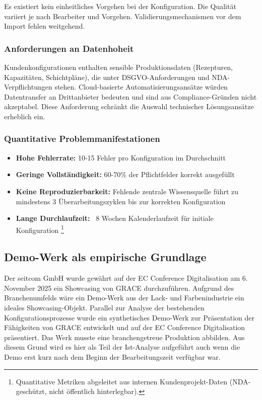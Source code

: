 Es existiert kein einheitliches Vorgehen bei der Konfiguration. Die Qualität variiert je nach Bearbeiter und Vorgehen. Validierungsmechanismen vor dem Import fehlen weitgehend.

\subsubsection{Anforderungen an Datenhoheit}
\label{subsubsec:Datenhoheit}

Kundenkonfigurationen enthalten sensible Produktionsdaten (Rezepturen, Kapazitäten, Schichtpläne), die unter DSGVO-Anforderungen und NDA-Verpflichtungen stehen. Cloud-basierte Automatisierungsansätze würden Datentransfer an Drittanbieter bedeuten und sind aus Compliance-Gründen nicht akzeptabel. Diese Anforderung schränkt die Auswahl technischer Lösungsansätze erheblich ein.

\subsubsection{Quantitative Problemmanifestationen}
\label{subsubsec:QuantitativeProbleme}

\begin{itemize}
    \item \textbf{Hohe Fehlerrate:} 10-15 Fehler pro Konfiguration im Durchschnitt
    \item \textbf{Geringe Vollständigkeit:} 60-70\% der Pflichtfelder korrekt ausgefüllt
    \item \textbf{Keine Reproduzierbarkeit:} Fehlende zentrale Wissensquelle führt zu mindestens 3 Überarbeitungszyklen bis zur korrekten Konfiguration
    \item \textbf{Lange Durchlaufzeit:} ~8 Wochen Kalenderlaufzeit für initiale Konfiguration \footnote{Quantitative Metriken abgeleitet aus internen Kundenprojekt-Daten (NDA-geschützt, nicht öffentlich hinterlegbar).}
\end{itemize}


\subsection{Demo-Werk als empirische Grundlage}
\label{subsec:DemoWerk}
Der seitcom GmbH wurde gewährt auf der EC Conference Digitalisation am 6. November 2025 ein Showcasing von GRACE durchzuführen. Aufgrund des Branchenumfelds wäre ein Demo-Werk aus der Lack- und Farbenindustrie ein ideales Showcasing-Objekt. Parallel zur Analyse der bestehenden Konfigurationsprozesse wurde ein synthetisches Demo-Werk zur Präsentation der Fähigkeiten von GRACE entwickelt und auf der EC Conference Digitalisation präsentiert. Das Werk musste eine branchengetreue Produktion abbilden. Aus diesem Grund wird es hier als Teil der Ist-Analyse aufgeführt auch wenn die Demo erst kurz nach dem Beginn der Bearbeitungszeit verfügbar war. 

